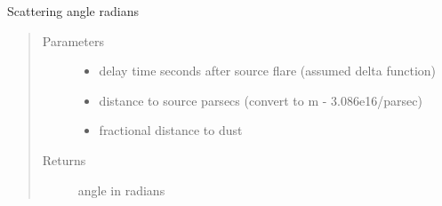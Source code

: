 \documentclass[letterpaper,10pt,english]{sphinxmanual}
\begin{document}
\begin{fulllineitems}
\label{\detokenize{xscat_functions:xscat.dustthetascat}}
Scattering angle radians
\begin{quote}\begin{description}
\item[{Parameters}] \leavevmode\begin{itemize}
\item {} 
 \textendash{} delay time seconds after source flare (assumed delta function)

\item {} 
 \textendash{} distance to source parsecs (convert to m - 3.086e16/parsec)

\item {} 
 \textendash{} fractional distance to dust

\end{itemize}

\item[{Returns}] \leavevmode
angle in radians

\end{description}\end{quote}

\end{fulllineitems}

\end{document}
